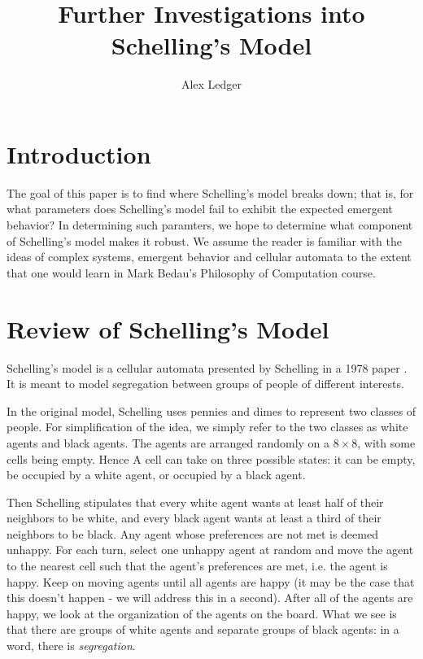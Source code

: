 \documentclass[11pt,twoside]{amsart}
\title{Further Investigations into Schelling's Model}
\author{Alex Ledger}
\date{}
\theoremstyle{theorem}
\theoremstyle{definition}
\theoremstyle{remark}
\begin{document}
\maketitle
\tableofcontents

\newpage

\section{Introduction}
The goal of this paper is to find where Schelling's model breaks down; that is, for what parameters does Schelling's model fail to exhibit the expected emergent behavior?
In determining such paramters, we hope to determine what component of Schelling's model makes it robust. 
We assume the reader is familiar with the ideas of complex systems, emergent behavior and cellular automata to the extent that one would learn in Mark Bedau's Philosophy of Computation course. 

\section{Review of Schelling's Model}
Schelling's model is a cellular automata presented by Schelling in a 1978 paper \cite{schelling}. 
It is meant to model segregation between groups of people of different interests. 

In the original model, Schelling uses pennies and dimes to represent two classes of people. 
For simplification of the idea, we simply refer to the two classes as white agents and black agents. 
The agents are arranged randomly on a $8 \times 8$, with some cells being empty. 
Hence A cell can take on three possible states: it can be empty, be occupied by a white agent, or occupied by a black agent. 

Then Schelling stipulates that every white agent wants at least half of their neighbors to be white, and every black agent wants at least a third of their neighbors to be black.
Any agent whose preferences are not met is deemed unhappy. 
For each turn, select one unhappy agent at random and move the agent to the nearest cell such that the agent's preferences are met, i.e. the agent is happy.
Keep on moving agents until all agents are happy (it may be the case that this doesn't happen - we will address this in a second). 
After all of the agents are happy, we look at the organization of the agents on the board. 
What we see is that there are groups of white agents and separate groups of black agents: in a word, there is \emph{segregation}.
\end{document}
